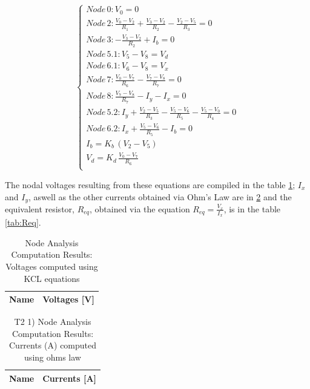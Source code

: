 \begin{equation} 
\begin{cases}

    Node\, 0: V_0 = 0 \\
    Node\, 2: \frac{V_0 - V_2}{R_1} + \frac{V_3 - V_2}{R_2} - \frac{V_2 - V_5}{R_3} = 0 \\
    Node\, 3: -\frac{V_3 - V_2}{R_2} + I_b = 0 \\
    Node\, 5.1: V_5 - V_8 = V_d \\
    Node\, 6.1: V_6 - V_8 = V_x \\
    Node\, 7: \frac{V_0 - V_7}{R_6} - \frac{V_7 - V_8}{R_7} = 0 \\
    Node\, 8: \frac{V_7 - V_8}{R_7} - I_y - I_x = 0 \\
    Node\, 5.2: I_y + \frac{V_2 - V_5}{R_3} - \frac{V_5 - V_6}{R_5} - \frac{V_5 - V_0}{R_4} = 0 \\
    Node\, 6.2: I_x + \frac{V_5 - V_6}{R_5} - I_b = 0 \\
    I_b = K_b\,(V_2 - V_5) \\
    V_d = K_d\,\frac{V_0 - V_7}{R_6}\\
    
\end{cases}
\label{eq:2}
\end{equation}

The nodal voltages resulting from these equations are compiled in the table \ref{tab:nodeVoltages2}; $I_x$ and $I_y$, aswell as the other currents obtained via
Ohm's Law are in \ref{tab:nodeCurrents2} and the equivalent resistor, $R_{eq}$, obtained via the equation $R_{eq} = \frac{V_x}{I_x}$, is in the table \ref{tab:Req}.

\begin{table}[h]
  \centering
  \begin{tabular}{|l|r|}
    \hline    
    {\bf Name} & {\bf Voltages [V]} \\ \hline
    
  \end{tabular}
  \caption{Node Analysis Computation Results: Voltages computed using KCL equations}
  \label{tab:nodeVoltages2}
\end{table}


\begin{table}[h]
  \centering
  \begin{tabular}{|l|r|}
    \hline    
    {\bf Name} & {\bf Currents [A]} \\ \hline
    
  \end{tabular}
  \caption{T2 1) Node Analysis Computation Results: Currents (A) computed using ohms law}
  \label{tab:nodeCurrents2}
\end{table}

